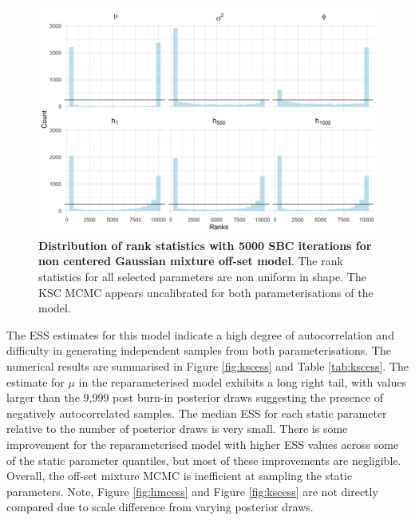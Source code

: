 \documentclass[12pt, a4paper]{article}
\begin{document}
    \begin{figure}[H]
        \centering
        \includegraphics[scale=0.09]{results/ksc_ncp_5k.png}
        \caption{\textbf{Distribution of rank statistics with 5000 SBC iterations for non centered Gaussian mixture off-set model}. The rank statistics for all selected parameters are non uniform in shape. The KSC MCMC appears uncalibrated for both parameterisations of the model.}
        \label{fig:ncpksc5k}
    \end{figure}

    The ESS estimates for this model indicate a high degree of autocorrelation and difficulty in generating independent samples from both parameterisations. The numerical results are summarised in Figure \ref{fig:kscess} and Table \ref{tab:kscess}. The estimate for $\mu$ in the reparameterised model exhibits a long right tail, with values larger than the 9,999 post burn-in posterior draws suggesting the presence of negatively autocorrelated samples. The median ESS for each static parameter relative to the number of posterior draws is very small. There is some improvement for the reparameterised model with higher ESS values across some of the static parameter quantiles, but most of these improvements are negligible. Overall, the off-set mixture MCMC is inefficient at sampling the static parameters. Note, Figure \ref{fig:hmcess} and Figure \ref{fig:kscess} are not directly compared due to scale difference from varying posterior draws.
    
    
\end{document}
